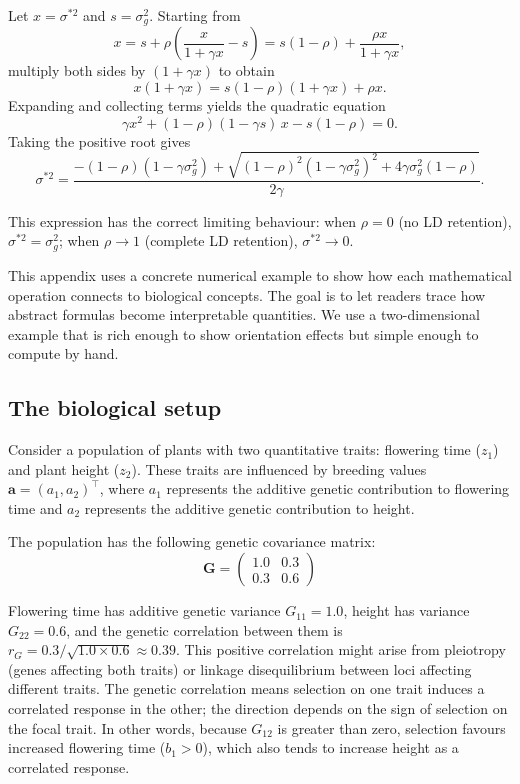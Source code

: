 \documentclass[9pt,twocolumn,twoside,lineno]{gsajnl}
\newcommand{\vect}[1]{\boldsymbol{#1}}
\newcommand{\mat}[1]{\mathbf{#1}}
\begin{document}
Let $x = \sigma^{*2}$ and $s = \sigma^2_g$. Starting from
\[
x = s + \rho\left(\frac{x}{1+\gamma x} - s\right)
= s(1-\rho) + \frac{\rho x}{1+\gamma x},
\]
multiply both sides by $(1+\gamma x)$ to obtain
\[
x(1+\gamma x) = s(1-\rho)(1+\gamma x) + \rho x.
\]
Expanding and collecting terms yields the quadratic equation
\[
\gamma x^2 + (1-\rho)(1-\gamma s)\,x - s(1-\rho) = 0.
\]
Taking the positive root gives
\begin{equation}
\sigma^{*2}
= \frac{-(1-\rho)(1-\gamma \sigma^2_g)
+ \sqrt{(1-\rho)^2(1-\gamma \sigma^2_g)^2 + 4\gamma \sigma^2_g(1-\rho)}}{2\gamma}.
\label{eq:sigma-star-S3}
\end{equation}

This expression has the correct limiting behaviour: when $\rho = 0$ (no LD retention), $\sigma^{*2} = \sigma^2_g$; when $\rho \to 1$ (complete LD retention), $\sigma^{*2} \to 0$.


This appendix uses a concrete numerical example to show how each mathematical operation connects to biological concepts. The goal is to let readers trace how abstract formulas become interpretable quantities. We use a two-dimensional example that is rich enough to show orientation effects but simple enough to compute by hand.

\subsection{The biological setup}

Consider a population of plants with two quantitative traits: flowering time ($z_1$) and plant height ($z_2$). These traits are influenced by breeding values $\vect{a} = (a_1, a_2)^\top$, where $a_1$ represents the additive genetic contribution to flowering time and $a_2$ represents the additive genetic contribution to height.

The population has the following genetic covariance matrix:
\begin{equation}
\mat{G} = \begin{pmatrix} 1.0 & 0.3 \\ 0.3 & 0.6 \end{pmatrix}
\end{equation}

Flowering time has additive genetic variance $G_{11} = 1.0$, height has variance $G_{22} = 0.6$, and the genetic correlation between them is $r_G = 0.3/\sqrt{1.0 \times 0.6} \approx 0.39$. This positive correlation might arise from pleiotropy (genes affecting both traits) or linkage disequilibrium between loci affecting different traits. The genetic correlation means selection on one trait induces a correlated response in the other; the direction depends on the sign of selection on the focal trait. In other words, because $ G_{12}$ is greater than zero, selection favours increased flowering time ($b_1>0$), which also tends to increase height as a correlated response.
\end{document}
